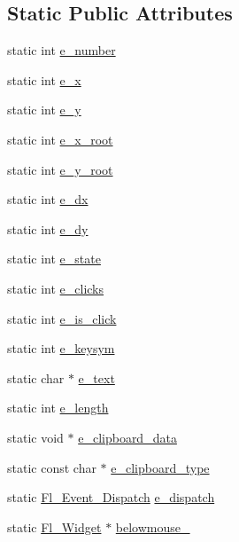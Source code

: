 \subsection*{Static Public Attributes}
\begin{DoxyCompactItemize}
\item 
static int \hyperlink{class_fl_a8e526e1b9e8824587ff9a641f191667a}{e\+\_\+number}
\item 
static int \hyperlink{class_fl_a7b57f90db4afa2b1b1e2e163e9bdc1d3}{e\+\_\+x}
\item 
static int \hyperlink{class_fl_a0c047ee4ea16066dc9e70bc6a4035c20}{e\+\_\+y}
\item 
static int \hyperlink{class_fl_ac905dc5f6e4b4c919e405932413fce30}{e\+\_\+x\+\_\+root}
\item 
static int \hyperlink{class_fl_af14bafd28cbd839ab2e4526eb4a5c73f}{e\+\_\+y\+\_\+root}
\item 
static int \hyperlink{class_fl_a3ef9e966bd64bac1a31bf926e7b640a2}{e\+\_\+dx}
\item 
static int \hyperlink{class_fl_a1ed9dbb954ea9d4d5eaae06ad0778708}{e\+\_\+dy}
\item 
static int \hyperlink{class_fl_a2d93787aec60cb62a759b36267dd9d06}{e\+\_\+state}
\item 
static int \hyperlink{class_fl_a6f6c6f8bf78bb722178aa19e501ae60e}{e\+\_\+clicks}
\item 
static int \hyperlink{class_fl_ad08a92882f820adac97a6dd98313e9b9}{e\+\_\+is\+\_\+click}
\item 
static int \hyperlink{class_fl_ad7e56c414916c270ba98e38e2cf41e57}{e\+\_\+keysym}
\item 
static char $\ast$ \hyperlink{class_fl_aee279db70dd1adfaf6387adb0024d079}{e\+\_\+text}
\item 
static int \hyperlink{class_fl_a336911cf63dade9bbb9707b942785133}{e\+\_\+length}
\item 
static void $\ast$ \hyperlink{class_fl_a17f5dc212787b6394977d7fe08708bca}{e\+\_\+clipboard\+\_\+data}
\item 
static const char $\ast$ \hyperlink{class_fl_a3a770b4956de5a41584dafbfc34a2da4}{e\+\_\+clipboard\+\_\+type}
\item 
static \hyperlink{group__callback__functions_ga2fa80da592860bc4c0c1a06d36262601}{Fl\+\_\+\+Event\+\_\+\+Dispatch} \hyperlink{class_fl_a1cbc5e8e4f682a17dc70688bed08e3fc}{e\+\_\+dispatch}
\item 
static \hyperlink{class_fl___widget}{Fl\+\_\+\+Widget} $\ast$ \hyperlink{class_fl_aafd98c6020994bab6d5ce017c395477c}{belowmouse\+\_\+}

\end{DoxyCompactItemize}
